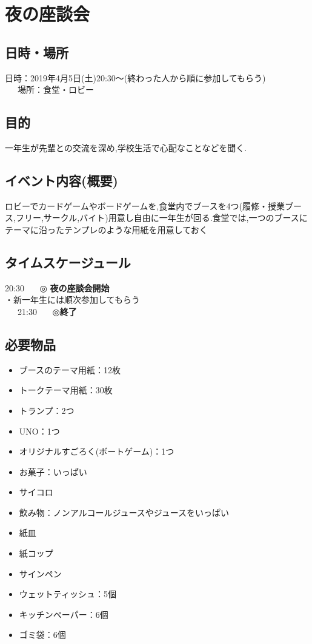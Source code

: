 
\section{夜の座談会}
\subsection{日時・場所}
日時：2019年4月5日(土)20:30〜(終わった人から順に参加してもらう)\\
\ \ \ 場所：食堂・ロビー\\
\subsection{目的}
一年生が先輩との交流を深め,学校生活で心配なことなどを聞く.
\subsection{イベント内容(概要)}
ロビーでカードゲームやボードゲームを,食堂内でブースを4つ(履修・授業ブース,フリー,サークル,バイト)用意し自由に一年生が回る.食堂では,一つのブースに
テーマに沿ったテンプレのような用紙を用意しておく
\subsection{タイムスケージュール}
20:30 \ \ \ ◎ \textbf{夜の座談会開始}\\
\hspace{15mm}・新一年生には順次参加してもらう \\
\ \ \ 21:30 \ \ \ ◎\textbf{終了}
\subsection{必要物品}
\begin{itemize}
\item ブースのテーマ用紙：12枚
\item トークテーマ用紙：30枚
\item トランプ：2つ
\item UNO：1つ
\item オリジナルすごろく(ボートゲーム)：1つ
\item お菓子：いっぱい
\item サイコロ
\item 飲み物：ノンアルコールジュースやジュースをいっぱい
\item 紙皿
\item 紙コップ
\item サインペン
\item ウェットティッシュ：5個
\item キッチンペーパー：6個
\item ゴミ袋：6個
\end{itemize}
